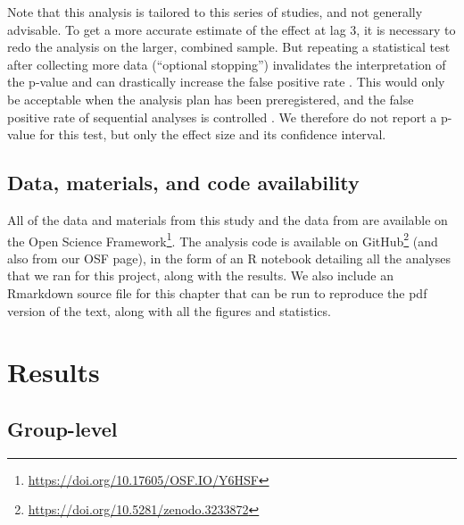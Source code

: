 \documentclass[11pt,]{memoir}
\let\rmarkdownfootnote\footnote%
\def\footnote{\protect\rmarkdownfootnote}
\renewcommand{\href}[2]{#2\footnote{\url{#1}}} %
\begin{document}
Note that this analysis is tailored to this series of studies, and not generally advisable. To get a more accurate estimate of the effect at lag 3, it is necessary to redo the analysis on the larger, combined sample. But repeating a statistical test after collecting more data (``optional stopping'') invalidates the interpretation of the p-value and can drastically increase the false positive rate \autocite{Simmons2011}. This would only be acceptable when the analysis plan has been preregistered, and the false positive rate of sequential analyses is controlled \autocite[for potential solutions, see][]{Lakens2014}. We therefore do not report a p-value for this test, but only the effect size and its confidence interval.

\hypertarget{data-materials-and-code-availability-1}{%
\subsection{Data, materials, and code availability}\label{data-materials-and-code-availability-1}}

All of the data and materials from this study and the data from \textcite{London2015} are available on the \href{https://doi.org/10.17605/OSF.IO/Y6HSF}{Open Science Framework}. The analysis code is available on \href{https://doi.org/10.5281/zenodo.3233872}{GitHub} (and also from our OSF page), in the form of an R notebook detailing all the analyses that we ran for this project, along with the results. We also include an Rmarkdown \autocite{Xie2018} source file for this chapter that can be run to reproduce the pdf version of the text, along with all the figures and statistics.

\hypertarget{AB_tDCS-results}{%
\section{Results}\label{AB_tDCS-results}}

\hypertarget{group-level}{%
\subsection{Group-level}\label{group-level}}
\end{document}
